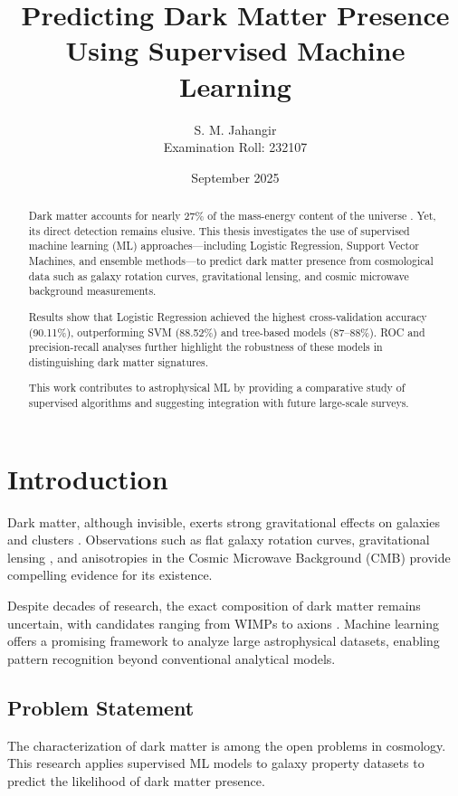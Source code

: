 \documentclass[12pt,a4paper]{report}
\title{Predicting Dark Matter Presence Using Supervised Machine Learning}
\author{S. M. Jahangir \\ Examination Roll: 232107}
\date{September 2025}
\begin{document}
\maketitle

\begin{abstract}
Dark matter accounts for nearly 27\% of the mass-energy content of the universe \cite{planck2016}. Yet, its direct detection remains elusive. 
This thesis investigates the use of supervised machine learning (ML) approaches---including Logistic Regression, Support Vector Machines, and ensemble methods---to predict dark matter presence from cosmological data such as galaxy rotation curves, gravitational lensing, and cosmic microwave background measurements. 

Results show that Logistic Regression achieved the highest cross-validation accuracy (90.11\%), outperforming SVM (88.52\%) and tree-based models (87--88\%). ROC and precision-recall analyses further highlight the robustness of these models in distinguishing dark matter signatures. 

This work contributes to astrophysical ML by providing a comparative study of supervised algorithms and suggesting integration with future large-scale surveys. 
\end{abstract}

\tableofcontents

\chapter{Introduction}
Dark matter, although invisible, exerts strong gravitational effects on galaxies and clusters \cite{rubin1970,zwicky1933}. 
Observations such as flat galaxy rotation curves, gravitational lensing \cite{clowe2006}, and anisotropies in the Cosmic Microwave Background (CMB) \cite{planck2016} provide compelling evidence for its existence. 

Despite decades of research, the exact composition of dark matter remains uncertain, with candidates ranging from WIMPs to axions \cite{bertone2005}. 
Machine learning offers a promising framework to analyze large astrophysical datasets, enabling pattern recognition beyond conventional analytical models. 

\section{Problem Statement}
The characterization of dark matter is among the open problems in cosmology. 
This research applies supervised ML models to galaxy property datasets to predict the likelihood of dark matter presence. 
\end{document}
